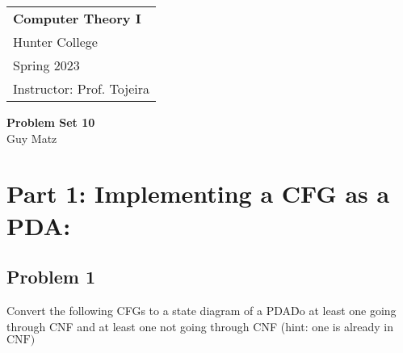 \documentclass[12pt]{scrbook}
\author{Guy Matz}
\begin{document}

  \begin{tabular}{p{15.5cm}}
    {\large \textbf{Computer Theory I}} \\
    Hunter College \\
    Spring 2023  \\
    Instructor: Prof. Tojeira\\
    \hline
  \end{tabular}
  \begin{center}
    {\Large \textbf{Problem Set 10}}
    \vspace{2mm}\\
    Guy Matz
  \end{center}

\section*{Part 1: Implementing a CFG as a PDA:}
\vspace{0.4cm}
\subsection*{Problem 1} Convert the following CFGs to a state diagram of a
PDA\. Do at least one going through CNF and at least one not going through CNF
(hint: one is already in $\mathrm{CNF})$
\end{document}
